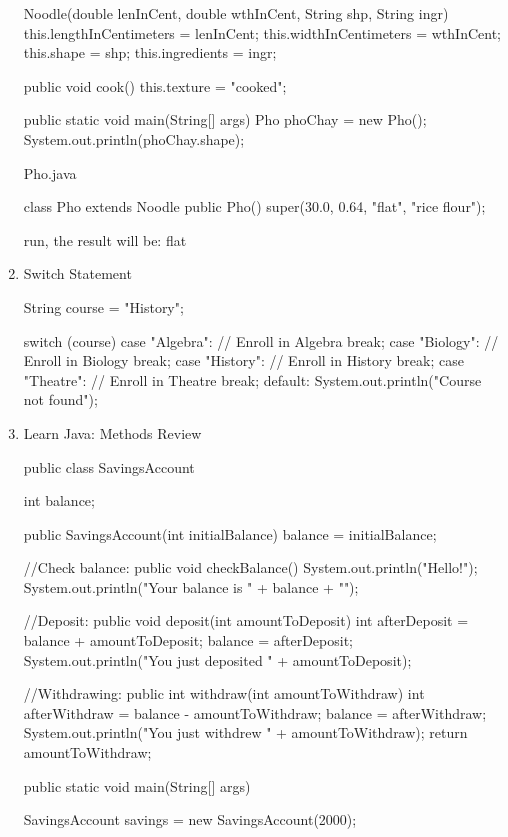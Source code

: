 \documentclass[a4paper,12pt]{article}
\begin{document}
\begin{enumerate}
\begin{javacode}
{  Noodle(double lenInCent, double wthInCent, String shp, String ingr) {
    this.lengthInCentimeters = lenInCent;
    this.widthInCentimeters = wthInCent;
    this.shape = shp;
    this.ingredients = ingr;
  }
  
  public void cook() {
    this.texture = "cooked";
  }
  
  public static void main(String[] args) {
    Pho phoChay = new Pho();
    System.out.println(phoChay.shape);
  }
}
\end{javacode}

Pho.java
\begin{javacode}
class Pho extends Noodle {
  public Pho() {
    super(30.0, 0.64, "flat", "rice flour");
  }
}
\end{javacode}
run, the result will be: flat

\item Switch Statement
\begin{javacode}
String course = "History";

switch (course) {
  case "Algebra": 
    // Enroll in Algebra
    break; 
  case "Biology": 
    // Enroll in Biology
    break;
  case "History": 
    // Enroll in History
    break;
  case "Theatre":
    // Enroll in Theatre
    break;
  default:
    System.out.println("Course not found");
}
\end{javacode}

\item Learn Java: Methods Review
\begin{javacode}
public class SavingsAccount {

  int balance;

  public SavingsAccount(int initialBalance) {
    balance = initialBalance;
  }

  //Check balance:
  public void checkBalance() {
    System.out.println("Hello!");
    System.out.println("Your balance is " + balance + "\n");
  }

  //Deposit:
  public void deposit(int amountToDeposit) {
    int afterDeposit = balance + amountToDeposit;
    balance = afterDeposit;
    System.out.println("You just deposited " + amountToDeposit);
  }

  //Withdrawing:
  public int withdraw(int amountToWithdraw) {
    int afterWithdraw = balance - amountToWithdraw;
    balance = afterWithdraw;
    System.out.println("You just withdrew " + amountToWithdraw);
    return amountToWithdraw;
  }

  public static void main(String[] args) {
    SavingsAccount savings = new SavingsAccount(2000);

}}
\end{javacode}
\end{enumerate}
\end{document}
